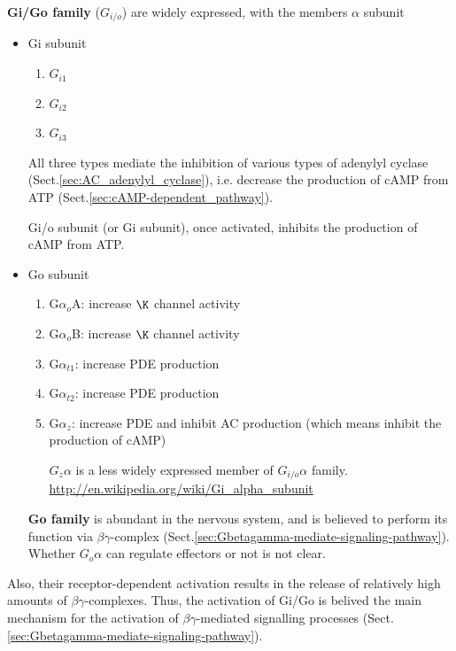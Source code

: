 {\bf Gi/Go family} ($G_{i/o}$) are widely expressed, with the members $\alpha$
subunit
\begin{itemize}
  \item Gi subunit
\begin{enumerate}
  \item $G_{i1}$
  
  \item $G_{i2}$
  
  \item $G_{i3}$ 
\end{enumerate}
All three types mediate the inhibition of various types of
adenylyl cyclase (Sect.\ref{sec:AC_adenylyl_cyclase}), i.e. decrease the
production of cAMP from ATP (Sect.\ref{sec:cAMP-dependent_pathway}). 

Gi/o subunit (or Gi subunit), once activated, inhibits the production of cAMP
from ATP.

  \item Go subunit
\begin{enumerate}
  \item G$\alpha_o$A: increase $\K$ channel activity
  
  \item G$\alpha_o$B: increase $\K$ channel activity
  
  \item G$\alpha_{t1}$: increase PDE production
  
  \item G$\alpha_{t2}$: increase PDE production
  
  \item G$\alpha_z$: increase PDE and inhibit AC production (which means
  inhibit the production of cAMP)

  $G_z\alpha$ is a less widely expressed member of $G_{i/o}\alpha$ family.
\url{http://en.wikipedia.org/wiki/Gi_alpha_subunit}

\end{enumerate}

{\bf Go family} is abundant in the nervous system, and is believed to perform
its function via $\beta\gamma$-complex
(Sect.\ref{sec:Gbetagamma-mediate-signaling-pathway}). Whether $G_o\alpha$ can
regulate effectors or not is not clear.

\end{itemize}

Also, their receptor-dependent activation results in the release of relatively
high amounts of $\beta\gamma$-complexes.
Thus, the activation of Gi/Go is belived the main mechanism for the activation
of $\beta\gamma$-mediated signalling processes
(Sect.\ref{sec:Gbetagamma-mediate-signaling-pathway}).


